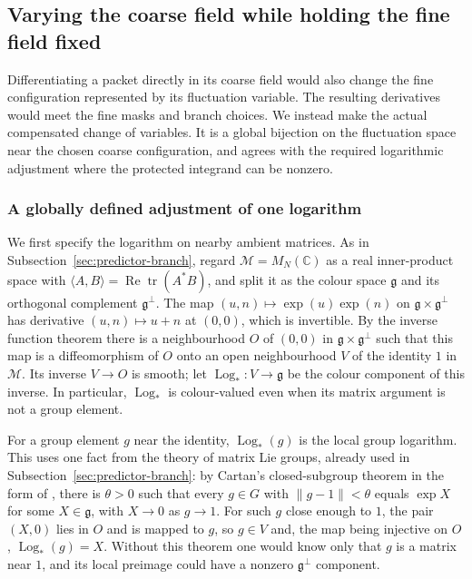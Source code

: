 \subsection{Varying the coarse field while holding the fine field fixed}
\label{sec:compensated-variation}
Differentiating a packet directly in its coarse field would also
change the fine configuration represented by its fluctuation variable.
The resulting derivatives would meet the fine masks and branch choices.
We instead make the actual compensated change of variables. It is a
global bijection on the fluctuation space near the chosen coarse
configuration, and agrees with the required logarithmic adjustment
where the protected integrand can be nonzero.

\subsubsection{A globally defined adjustment of one logarithm}
We first specify the logarithm on nearby ambient matrices. As in
Subsection~\ref{sec:predictor-branch}, regard $\mathcal M=M_N(\mathbb C)$
as a real inner-product space with
$\langle A,B\rangle=\operatorname{Re}\operatorname{tr}(A^*B)$, and split
it as the colour space $\mathfrak g$ and its orthogonal complement
$\mathfrak g^\perp$. The map $(u,n)\mapsto\exp(u)\exp(n)$ on
$\mathfrak g\times\mathfrak g^\perp$ has derivative $(u,n)\mapsto u+n$
at $(0,0)$, which is invertible. By the inverse function theorem there
is a neighbourhood $O$ of $(0,0)$ in $\mathfrak g\times\mathfrak g^\perp$
such that this map is a diffeomorphism of $O$ onto an open neighbourhood
$V$ of the identity $1$ in $\mathcal M$. Its inverse
$V\to O$ is smooth; let $\operatorname{Log}_*\colon V\to\mathfrak g$
be the colour component of this inverse.
In particular, $\operatorname{Log}_*$ is colour-valued even when its
matrix argument is not a group element.

For a group element $g$ near the identity, $\operatorname{Log}_*(g)$
is the local group logarithm. This uses one fact from the theory of
matrix Lie groups, already used in Subsection~\ref{sec:predictor-branch}:
by Cartan's closed-subgroup theorem in the form of
\cite[Corollary~3.44]{Hall2015}, there is $\theta>0$ such that every
$g\in G$ with $\|g-1\|<\theta$ equals $\exp X$ for some
$X\in\mathfrak g$, with $X\to0$ as $g\to1$. For such $g$ close
enough to $1$, the pair $(X,0)$ lies in $O$ and is mapped to $g$, so
$g\in V$ and, the map being injective on $O$, $\operatorname{Log}_*(g)=X$.
Without this theorem one would know only that $g$ is a matrix near
$1$, and its local preimage could have a nonzero
$\mathfrak g^\perp$ component.

